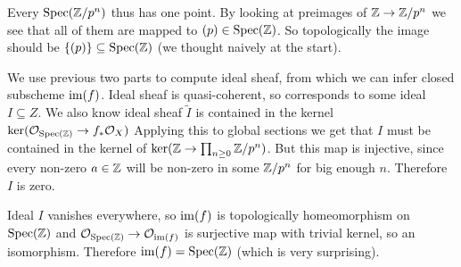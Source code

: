 \begin{exercise}{4}
\begin{enumerate}
{            Every $\operatorname{Spec}(\mathbb{Z}/p^n)$ thus has one point.
            By looking at preimages of $\mathbb{Z} \to \mathbb{Z} / p^n$ we see that
            all of them are mapped to $(p) \in \operatorname{Spec}(\mathbb{Z})$.
            So topologically the image should be $\{(p)\} \subseteq \operatorname{Spec}(\mathbb{Z})$
            (we thought naively at the start).

            We use previous two parts to compute ideal sheaf, from which we can
            infer closed subscheme $\operatorname{im}(f)$.
            Ideal sheaf is quasi-coherent, so corresponds to some ideal $I
            \subseteq Z$.
            We also know ideal sheaf $\tilde{I}$ is contained in the kernel
            $\ker(\mathcal{O}_{\operatorname{Spec}(\mathbb{Z})} \to f_* \mathcal{O}_X)$
            Applying this to global sections we get that $I$ must be
            contained in the kernel of $\ker(\mathbb{Z} \to \prod_{n \geq 0} \mathbb{Z} / p^n)$.
            But this map is injective, since every non-zero $a \in \mathbb{Z}$ will be non-zero
            in some $\mathbb{Z} / p^n$ for big enough $n$. Therefore $I$ is zero.

            Ideal $I$ vanishes everywhere, so $\operatorname{im}(f)$ is topologically
            homeomorphism on $\operatorname{Spec}(\mathbb{Z})$ and $\mathcal{O}_{\operatorname{Spec}(\mathbb{Z})} \to
            \mathcal{O}_{\operatorname{im}(f)}$ is surjective map with trivial kernel, so an
            isomorphism. Therefore $\operatorname{im}(f) = \operatorname{Spec}(\mathbb{Z})$ (which is very
            surprising).
            }
    \end{enumerate}

\end{exercise}


